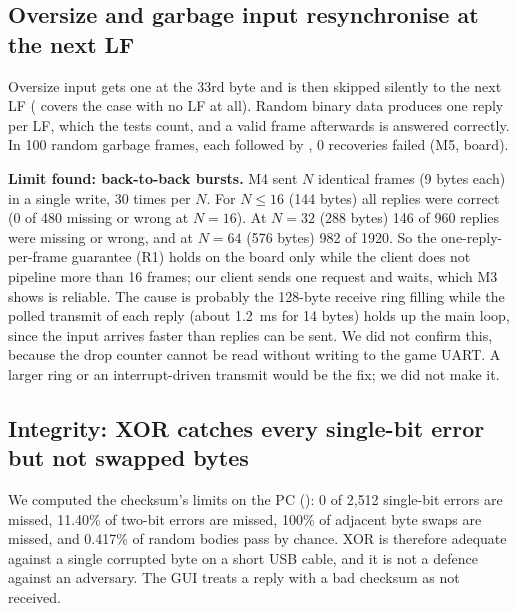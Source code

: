 \subsection{Oversize and garbage input resynchronise at the next LF}
Oversize input gets one  at the 33rd byte and is then skipped silently to the next LF
( covers the case with no LF at all). Random binary data produces one reply per LF, which the tests count, and a
valid frame afterwards is answered correctly. In 100 random garbage frames, each followed by , 0 recoveries failed (M5, board).

\textbf{Limit found: back-to-back bursts.} M4 sent $N$ identical  frames (9 bytes each) in a single write, 30 times per $N$. For $N\le16$ (144 bytes) all replies were correct (0 of 480 missing or wrong at $N=16$). At $N=32$ (288 bytes) 146 of 960 replies were missing or wrong, and at $N=64$ (576 bytes) 982 of 1920. So the one-reply-per-frame guarantee (R1) holds on the board only while the client does not pipeline more than 16 frames; our client sends one request and waits, which M3 shows is reliable. The cause is probably the 128-byte receive ring filling while the polled transmit of each reply (about 1.2~ms for 14 bytes) holds up the main loop, since the input arrives faster than replies can be sent. We did not confirm this, because the drop counter cannot be read without writing to the game UART. A larger ring or an interrupt-driven transmit would be the fix; we did not make it.

\subsection{Integrity: XOR catches every single-bit error but not swapped bytes}
We computed the checksum's limits on the PC (): 0 of 2{,}512 single-bit errors are missed, 11.40\% of two-bit errors are missed,
100\% of adjacent byte swaps are missed, and 0.417\% of random bodies pass by chance. XOR is therefore adequate against a single corrupted byte on a short USB cable, and it is not a defence
against an adversary. The GUI treats a reply with a bad checksum as not received.

